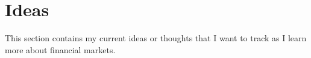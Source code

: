 \section{Ideas}

This section contains my current ideas or thoughts that I want to track as I learn more about financial markets.




